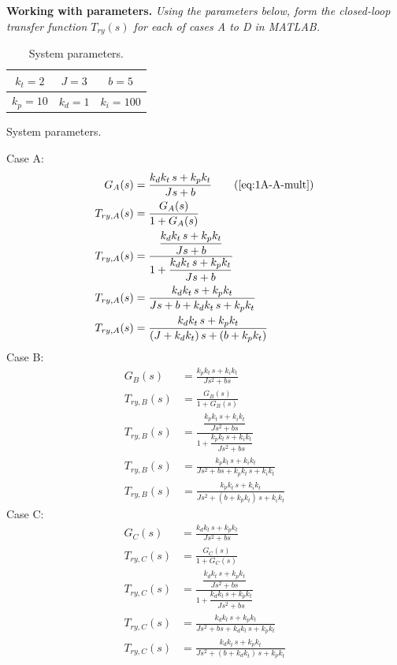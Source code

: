 \documentclass[11pt,letterpaper]{article}
\newenvironment{answertable}[2]{%
  \def\anstabcap{#2}%
  \begin{table}[H]
  \centering
  \renewcommand{\arraystretch}{1.4}
  \begin{tabular}{#1}
}{%
  \end{tabular}
  \ifx\anstabcap\empty\else\caption{\anstabcap}\fi
  \end{table}%
}
\newcommand{\prompt}[1]{%
  \noindent\textit{#1}\par\vspace{6pt}%
}
\begin{document}
\clearpage
\noindent\textbf{Working with parameters.}
\prompt{Using the parameters below, form the closed-loop transfer function $T_{ry}(s)$ for each of cases A to D in MATLAB.}
\begin{answertable}{|c|c|c|}{System parameters.}
  \hline
  $k_t = 2$  & $J = 3$   & $b = 5$     \\ \hline
  $k_p = 10$ & $k_d = 1$ & $k_i = 100$ \\ \hline
\end{answertable}
\noindent Case A:
\begin{align}
  G_A(s) &= \frac{k_d k_t\,s + k_p k_t}{Js + b} \tag{\ref{eq:1A-A-mult}} \\
  T_{ry,A}(s) &= \frac{G_A(s)}{1 + G_A(s)} \label{eq:WP-A-Try} \\
  T_{ry,A}(s) &= \frac{\dfrac{k_d k_t\,s + k_p k_t}{Js + b}}{1 + \dfrac{k_d k_t\,s + k_p k_t}{Js + b}} \label{eq:WP-A-Try-sub} \\
  T_{ry,A}(s) &= \frac{k_d k_t\,s + k_p k_t}{Js + b + k_d k_t\,s + k_p k_t} \label{eq:WP-A-Try-mult} \\
  T_{ry,A}(s) &= \frac{k_d k_t\,s + k_p k_t}{(J + k_d k_t)\,s + (b + k_p k_t)} \label{eq:WP-A-Try-coll}
\end{align}
\noindent Case B:
\begin{align}
  G_B(s) &= \frac{k_p k_t\,s + k_i k_t}{Js^2 + bs} \label{eq:WP-B} \\
  T_{ry,B}(s) &= \frac{G_B(s)}{1 + G_B(s)} \label{eq:WP-B-Try} \\
  T_{ry,B}(s) &= \frac{\dfrac{k_p k_t\,s + k_i k_t}{Js^2 + bs}}{1 + \dfrac{k_p k_t\,s + k_i k_t}{Js^2 + bs}} \label{eq:WP-B-Try-sub} \\
  T_{ry,B}(s) &= \frac{k_p k_t\,s + k_i k_t}{Js^2 + bs + k_p k_t\,s + k_i k_t} \label{eq:WP-B-Try-mult} \\
  T_{ry,B}(s) &= \frac{k_p k_t\,s + k_i k_t}{Js^2 + (b + k_p k_t)\,s + k_i k_t} \label{eq:WP-B-Try-coll}
\end{align}
\noindent Case C:
\begin{align}
  G_C(s) &= \frac{k_d k_t\,s + k_p k_t}{Js^2 + bs} \label{eq:WP-C} \\
  T_{ry,C}(s) &= \frac{G_C(s)}{1 + G_C(s)} \label{eq:WP-C-Try} \\
  T_{ry,C}(s) &= \frac{\dfrac{k_d k_t\,s + k_p k_t}{Js^2 + bs}}{1 + \dfrac{k_d k_t\,s + k_p k_t}{Js^2 + bs}} \label{eq:WP-C-Try-sub} \\
  T_{ry,C}(s) &= \frac{k_d k_t\,s + k_p k_t}{Js^2 + bs + k_d k_t\,s + k_p k_t} \label{eq:WP-C-Try-mult} \\
  T_{ry,C}(s) &= \frac{k_d k_t\,s + k_p k_t}{Js^2 + (b + k_d k_t)\,s + k_p k_t} \label{eq:WP-C-Try-coll}
\end{align}
\end{document}
